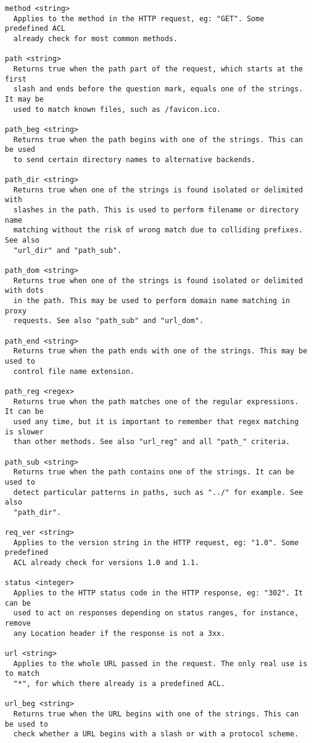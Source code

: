 \begin{verbatim}
method <string>
  Applies to the method in the HTTP request, eg: "GET". Some predefined ACL
  already check for most common methods.

path <string>
  Returns true when the path part of the request, which starts at the first
  slash and ends before the question mark, equals one of the strings. It may be
  used to match known files, such as /favicon.ico.

path_beg <string>
  Returns true when the path begins with one of the strings. This can be used
  to send certain directory names to alternative backends.

path_dir <string>
  Returns true when one of the strings is found isolated or delimited with
  slashes in the path. This is used to perform filename or directory name
  matching without the risk of wrong match due to colliding prefixes. See also
  "url_dir" and "path_sub".

path_dom <string>
  Returns true when one of the strings is found isolated or delimited with dots
  in the path. This may be used to perform domain name matching in proxy
  requests. See also "path_sub" and "url_dom".

path_end <string>
  Returns true when the path ends with one of the strings. This may be used to
  control file name extension.

path_reg <regex>
  Returns true when the path matches one of the regular expressions. It can be
  used any time, but it is important to remember that regex matching is slower
  than other methods. See also "url_reg" and all "path_" criteria.

path_sub <string>
  Returns true when the path contains one of the strings. It can be used to
  detect particular patterns in paths, such as "../" for example. See also
  "path_dir".

req_ver <string>
  Applies to the version string in the HTTP request, eg: "1.0". Some predefined
  ACL already check for versions 1.0 and 1.1.

status <integer>
  Applies to the HTTP status code in the HTTP response, eg: "302". It can be
  used to act on responses depending on status ranges, for instance, remove
  any Location header if the response is not a 3xx.

url <string>
  Applies to the whole URL passed in the request. The only real use is to match
  "*", for which there already is a predefined ACL.

url_beg <string>
  Returns true when the URL begins with one of the strings. This can be used to
  check whether a URL begins with a slash or with a protocol scheme.


\end{verbatim}
